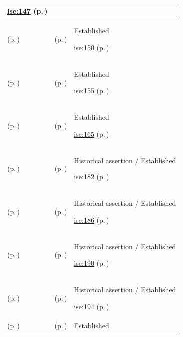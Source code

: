 \begin{longtable}{|>{\raggedright\arraybackslash}p{0.27\TableWidth}|>{\raggedright\arraybackslash}p{0.27\TableWidth}|>{\raggedright\arraybackslash}p{0.46\TableWidth}|}
 \hyperref[rad:ise:140]{ise:147} (p.\,\pageref{rad:ise:140})\\\hline
\nameref{service:collaboration-clinical-summary-resolution} (p.\,\pageref{service:collaboration-clinical-summary-resolution}) & \nameref{feature:feat-ise-17} (p.\,\pageref{feature:feat-ise-17}) & Established

 \hyperref[rad:ise:140]{ise:150} (p.\,\pageref{rad:ise:140})\\\hline
\nameref{service:collaboration-space-governance-service} (p.\,\pageref{service:collaboration-space-governance-service}) & \nameref{feature:feat-ise-18} (p.\,\pageref{feature:feat-ise-18}) & Established

 \hyperref[rad:ise:140]{ise:155} (p.\,\pageref{rad:ise:140})\\\hline
\nameref{service:operational-collaboration-service} (p.\,\pageref{service:operational-collaboration-service}) & \nameref{feature:feat-ise-19} (p.\,\pageref{feature:feat-ise-19}) & Established

 \hyperref[rad:ise:161]{ise:165} (p.\,\pageref{rad:ise:161})\\\hline
\nameref{service:work-order-coordination-service} (p.\,\pageref{service:work-order-coordination-service}) & \nameref{feature:feat-ise-20} (p.\,\pageref{feature:feat-ise-20}) & Historical assertion / Established

 \hyperref[rad:ise:171]{ise:182} (p.\,\pageref{rad:ise:171})\\\hline
\nameref{service:to-do-management-service} (p.\,\pageref{service:to-do-management-service}) & \nameref{feature:feat-ise-21} (p.\,\pageref{feature:feat-ise-21}) & Historical assertion / Established

 \hyperref[rad:ise:171]{ise:186} (p.\,\pageref{rad:ise:171})\\\hline
\nameref{service:synthetic-task-execution-service} (p.\,\pageref{service:synthetic-task-execution-service}) & \nameref{feature:feat-ise-22} (p.\,\pageref{feature:feat-ise-22}) & Historical assertion / Established

 \hyperref[rad:ise:171]{ise:190} (p.\,\pageref{rad:ise:171})\\\hline
\nameref{service:activity-escalation-telemetry} (p.\,\pageref{service:activity-escalation-telemetry}) & \nameref{feature:feat-ise-23} (p.\,\pageref{feature:feat-ise-23}) & Historical assertion / Established

 \hyperref[rad:ise:171]{ise:194} (p.\,\pageref{rad:ise:171})\\\hline
\nameref{service:unified-calendar-projection-query} (p.\,\pageref{service:unified-calendar-projection-query}) & \nameref{feature:feat-ise-24} (p.\,\pageref{feature:feat-ise-24}) & Established


\end{longtable}
